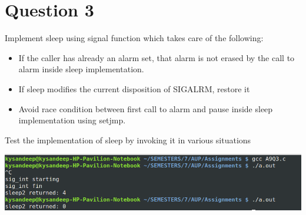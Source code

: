 \documentclass[main.tex]{subfiles}
\begin{document}
\section{Question 3}
Implement sleep using signal function which takes care of the following:
\begin{itemize}
  \item If the caller has already an alarm set, that alarm is not erased by the
    call to alarm inside sleep implementation.
  \item If sleep modifies the current disposition of SIGALRM, restore it
  \item Avoid race condition between first call to alarm and pause inside sleep
    implementation using setjmp.
\end{itemize}
Test the implementation of sleep by invoking it in various situations


\includegraphics[width=\textwidth]{figures/3_output.png}
\end{document}

